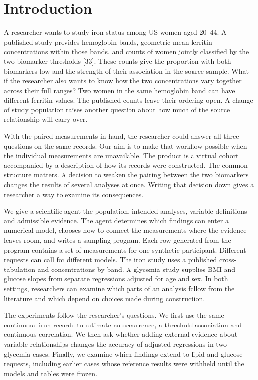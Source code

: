 \documentclass[sigconf,review]{acmart}
\begin{document}
\section{Introduction}

A researcher wants to study iron status among US women aged 20–\allowbreak{}44. A published study provides hemoglobin bands, geometric mean ferritin concentrations within those bands, and counts of women jointly classified by the two biomarker thresholds [33]. These counts give the proportion with both biomarkers low and the strength of their association in the source sample. What if the researcher also wants to know how the two concentrations vary together across their full ranges? Two women in the same hemoglobin band can have different ferritin values. The published counts leave their ordering open. A change of study population raises another question about how much of the source relationship will carry over.


With the paired measurements in hand, the researcher could answer all three questions on the same records. Our aim is to make that workflow possible when the individual measurements are unavailable. The product is a virtual cohort accompanied by a description of how its records were constructed. The common structure matters. A decision to weaken the pairing between the two biomarkers changes the results of several analyses at once. Writing that decision down gives a researcher a way to examine its consequences.


We give a scientific agent the population, intended analyses, variable definitions and admissible evidence. The agent determines which findings can enter a numerical model, chooses how to connect the measurements where the evidence leaves room, and writes a sampling program. Each row generated from the program contains a set of measurements for one synthetic participant. Different requests can call for different models. The iron study uses a published cross-tabulation and concentrations by band. A glycemia study supplies BMI and glucose slopes from separate regressions adjusted for age and sex. In both settings, researchers can examine which parts of an analysis follow from the literature and which depend on choices made during construction.


The experiments follow the researcher's questions. We first use the same continuous iron records to estimate co-occurrence, a threshold association and continuous correlation. We then ask whether adding external evidence about variable relationships changes the accuracy of adjusted regressions in two glycemia cases. Finally, we examine which findings extend to lipid and glucose requests, including earlier cases whose reference results were withheld until the models and tables were frozen.
\end{document}
